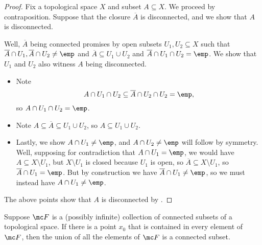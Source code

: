 \documentclass[../notes.tex]{subfiles}
\begin{document}
\begin{proof}
	Fix a topological space $X$ and subset $A\subseteq X$. We proceed by contraposition. Suppose that the closure $\overline A$ is disconnected, and we show that $A$ is disconnected.

	Well, $\overline A$ being connected promises by  open subsets $U_1,U_2\subseteq X$ such that $\overline A\cap U_1,\overline A\cap U_2\ne\emp$ and $\overline A\subseteq U_1\cup U_2$ and $\overline A\cap U_1\cap U_2=\emp$. We show that {$U_1$ and $U_2$ also witness $A$ being disconnected}.
	\begin{itemize}
		\item Note
		\[A\cap U_1\cap U_2\subseteq\overline A\cap U_2\cap U_2=\emp,\]
		so $A\cap U_1\cap U_2=\emp$.
		\item Note $A\subseteq\overline A\subseteq U_1\cup U_2$, so $A\subseteq U_1\cup U_2$.
		\item Lastly, we show $A\cap U_1\ne\emp$, and $A\cap U_2\ne\emp$ will follow by symmetry. Well, supposing for contradiction that {$A\cap U_1=\emp$, we would have $A\subseteq X\setminus U_1$, but $X\setminus U_1$ is closed because $U_1$ is open, so $\overline A\subseteq X\setminus U_1$, so $\overline A\cap U_1=\emp$}. But by construction we have $\overline A\cap U_1\ne\emp$, so we must instead have $A\cap U_1\ne\emp$.
	\end{itemize}
	The above points show that $A$ is disconnected by .
\end{proof}
\begin{lemma} \label{lem:unionconns}
	Suppose $\mc F$ is a (possibly infinite) collection of connected subsets of a topological space. If there is a point $x_0$ that is contained in every element of $\mc F$, then the union of all the elements of $\mc F$ is a connected subset.
\end{lemma}
\end{document}

